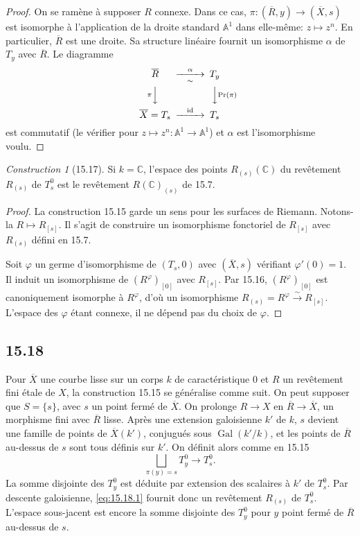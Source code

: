 \documentclass[12pt,a4paper]{article}
\theoremstyle{plain}
\theoremstyle{definition}
\theoremstyle{remark}
\newtheorem{construction}[theorem]{Construction}
\DeclareMathOperator{\Gal}{Gal}
\DeclareMathOperator{\id}{id}
\newcommand{\bC}{\mathbb{C}}
\newcommand{\bA}{\mathbb{A}}
\begin{document}
\begin{proof}
On se ramène à supposer $R$ connexe. Dans ce cas, $\pi : (\overline{R}, y) \to (\overline{X}, s)$ est isomorphe à l'application de la droite standard $\bA^1$ dans elle-même: $z \mapsto z^n$. En particulier, $\overline{R}$ est une droite. Sa structure linéaire fournit un isomorphisme $\alpha$ de $T_y$ avec $\overline{R}$. Le diagramme
\[
\begin{CD}
\overline{R} @>{\alpha}>{\sim}> T_y \\
@V{\pi}VV @VV{\Pr(\pi)}V \\
\overline{X} = T_s @>{\id}>> T_s
\end{CD}
\]
est commutatif (le vérifier pour $z \mapsto z^n: \bA^1 \to \bA^1$) et $\alpha$ est l'isomorphisme voulu.
\end{proof}

\begin{construction}[15.17]
Si $k = \bC$, l'espace des points $R_{(s)}(\bC)$ du revêtement $R_{(s)}$ de $T_s^0$ est le revêtement $R(\bC)_{(s)}$ de 15.7.
\end{construction}

\begin{proof}
La construction 15.15 garde un sens pour les surfaces de Riemann. Notons-la $R \mapsto R_{[s]}$. Il s'agit de construire un isomorphisme fonctoriel de $R_{[s]}$ avec $R_{(s)}$ défini en 15.7.

Soit $\varphi$ un germe d'isomorphisme de $(T_s, 0)$ avec $(\overline{X}, s)$ vérifiant $\varphi'(0) = 1$. Il induit un isomorphisme de $(R^\varphi)_{[0]}$ avec $R_{[s]}$. Par 15.16, $(R^\varphi)_{[0]}$ est canoniquement isomorphe à $R^\varphi$, d'où un isomorphisme $R_{(s)} = R^\varphi \xrightarrow{\sim} R_{[s]}$. L'espace des $\varphi$ étant connexe, il ne dépend pas du choix de $\varphi$.
\end{proof}

\subsection*{15.18}

Pour $\overline{X}$ une courbe lisse sur un corps $k$ de caractéristique $0$ et $R$ un revêtement fini étale de $X$, la construction 15.15 se généralise comme suit. On peut supposer que $S = \{s\}$, avec $s$ un point fermé de $\overline{X}$. On prolonge $R \to X$ en $\overline{R} \to \overline{X}$, un morphisme fini avec $\overline{R}$ lisse. Après une extension galoisienne $k'$ de $k$, $s$ devient une famille de points de $\overline{X}(k')$, conjugués sous $\Gal(k'/k)$, et les points de $\overline{R}$ au-dessus de $s$ sont tous définis sur $k'$. On définit alors comme en 15.15
\begin{equation}\label{eq:15.18.1}
\bigsqcup_{\pi(y) = s} T_y^0 \to T_s^0.
\end{equation}
La somme disjointe des $T_y^0$ est déduite par extension des scalaires à $k'$ de $T_s^0$. Par descente galoisienne, \eqref{eq:15.18.1} fournit donc un revêtement $R_{(s)}$ de $T_s^0$. L'espace sous-jacent est encore la somme disjointe des $T_y^0$ pour $y$ point fermé de $\overline{R}$ au-dessus de $s$.
\end{document}
